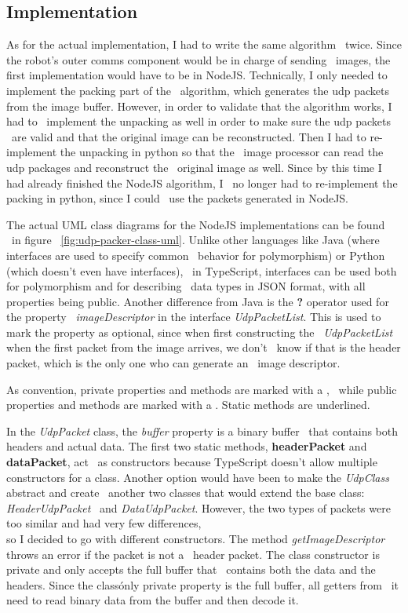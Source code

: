 \subsection{Implementation}
\label{subsec:udp-packer-implementation}
As for the actual implementation, I had to write the same algorithm \
twice.
Since the robot's outer comms component would be in charge of sending \
images, the first implementation would have to be in NodeJS.
Technically, I only needed to implement the packing part of the \
algorithm, which generates the udp packets from the image buffer.
However, in order to validate that the algorithm works, I had to \
implement the unpacking as well in order to make sure the udp packets \
are valid and that the original image can be reconstructed.
Then I had to re-implement the unpacking in python so that the \
image processor can read the udp packages and reconstruct the \
original image as well.
Since by this time I had already finished the NodeJS algorithm, I \
no longer had to re-implement the packing in python, since I could \
use the packets generated in NodeJS.

The actual UML class diagrams for the NodeJS implementations can be found \
in figure ~\ref{fig:udp-packer-class-uml}.
Unlike other languages like Java (where interfaces are used to specify common \
behavior for polymorphism) or Python (which doesn't even have interfaces), \
in TypeScript, interfaces can be used both for polymorphism and for describing \
data types in JSON format, with all properties being public.
Another difference from Java is the \textbf{?} operator used for the property \
\textit{imageDescriptor} in the interface \textit{UdpPacketList}.
This is used to mark the property as optional, since when first constructing the \
\textit{UdpPacketList} when the first packet from the image arrives, we don't \
know if that is the header packet, which is the only one who can generate an \
image descriptor.

As convention, private properties and methods are marked with a \textbf{\-}, \
while public properties and methods are marked with a \textbg{\+}.
Static methods are underlined.

In the \textit{UdpPacket} class, the \textit{buffer} property is a binary buffer \
that contains both headers and actual data.
The first two static methods, \textbf{headerPacket} and \textbf{dataPacket}, act \
as constructors because TypeScript doesn't allow multiple constructors for a class.
Another option would have been to make the \textit{UdpClass} abstract and create \
another two classes that would extend the base class: \textit{HeaderUdpPacket} \
and \textit{DataUdpPacket}.
However, the two types of packets were too similar and had very few differences, \\
so I decided to go with different constructors.
The method \textit{getImageDescriptor} throws an error if the packet is not a \
header packet.
The class constructor is private and only accepts the full buffer that \
contains both the data and the headers.
Since the class\' only private property is the full buffer, all getters from \
it need to read binary data from the buffer and then decode it.

